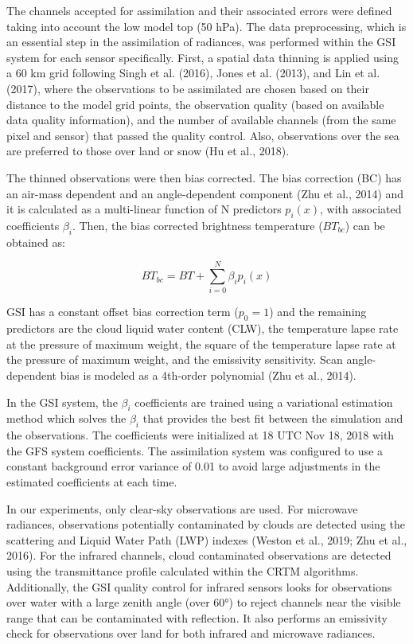 \documentclass[authoryear,preprint,review,12pt]{elsarticle} %
\begin{document}
The channels accepted for assimilation and their associated errors were defined taking into account the low model top (50 hPa). The data preprocessing, which is an essential step in the assimilation of radiances, was performed within the GSI system for each sensor specifically. First, a spatial data thinning is applied using a 60 km grid following Singh et al. (2016), Jones et al. (2013), and Lin et al. (2017), where the observations to be assimilated are chosen based on their distance to the model grid points, the observation quality (based on available data quality information), and the number of available channels (from the same pixel and sensor) that passed the quality control. Also, observations over the sea are preferred to those over land or snow (Hu et al., 2018).

The thinned observations were then bias corrected. The bias correction (BC) has an air-mass dependent and an angle-dependent component (Zhu et al., 2014) and it is calculated as a multi-linear function of N predictors \(p_i(x)\), with associated coefficients \(\beta_i\). Then, the bias corrected brightness temperature (\(BT_{bc}\)) can be obtained as:

\[\mathit{BT_{bc}} =\mathit{ BT} + \sum_{i = 0}^{N} \beta_i p_i (x)\]

GSI has a constant offset bias correction term (\(p_0 = 1\)) and the remaining predictors are the cloud liquid water content (CLW), the temperature lapse rate at the pressure of maximum weight, the square of the temperature lapse rate at the pressure of maximum weight, and the emissivity sensitivity. Scan angle-dependent bias is modeled as a 4th-order polynomial (Zhu et al., 2014).

In the GSI system, the \(\beta_i\) coefficients are trained using a variational estimation method which solves the \(\beta_i\) that provides the best fit between the simulation and the observations. The coefficients were initialized at 18 UTC Nov 18, 2018 with the GFS system coefficients. The assimilation system was configured to use a constant background error variance of 0.01 to avoid large adjustments in the estimated coefficients at each time.

In our experiments, only clear-sky observations are used. For microwave radiances, observations potentially contaminated by clouds are detected using the scattering and Liquid Water Path (LWP) indexes (Weston et al., 2019; Zhu et al., 2016). For the infrared channels, cloud contaminated observations are detected using the transmittance profile calculated within the CRTM algorithms. Additionally, the GSI quality control for infrared sensors looks for observations over water with a large zenith angle (over 60°) to reject channels near the visible range that can be contaminated with reflection. It also performs an emissivity check for observations over land for both infrared and microwave radiances.
\end{document}
